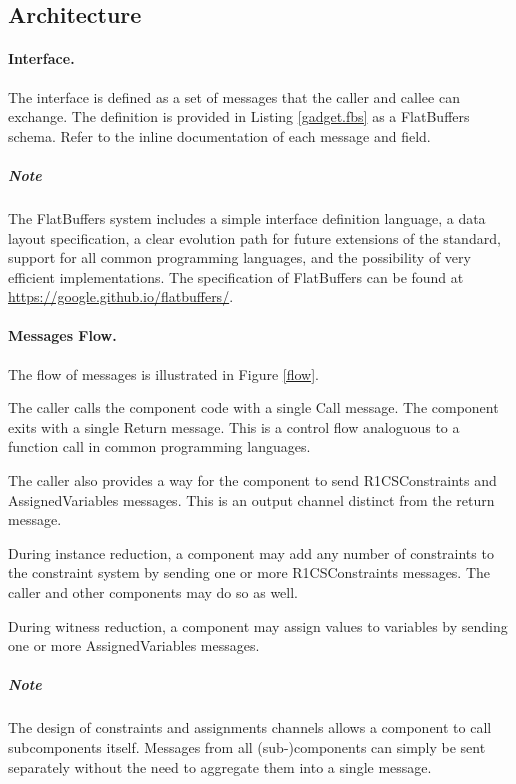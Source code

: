 \subsection{Architecture}


\paragraph{Interface.}

	The interface is defined as a set of messages that the caller and callee can exchange.
	The definition is provided in Listing \ref{gadget.fbs} as a FlatBuffers schema.
	Refer to the inline documentation of each message and field.

	\subparagraph{Note}
	The FlatBuffers system includes a simple interface definition language,
	a data layout specification,
	a clear evolution path for future extensions of the standard,
	support for all common programming languages,
	and the possibility of very efficient implementations.
	The specification of FlatBuffers can be found at
	\href{https://google.github.io/flatbuffers/}{https://google.github.io/flatbuffers/}.

\paragraph{Messages Flow.}

	The flow of messages is illustrated in Figure \ref{flow}.

	The caller calls the component code with a single Call message.
	The component exits with a single Return message.
	This is a control flow analoguous to a function call in common programming languages.

	The caller also provides a way for the component to send 
	R1CSConstraints and AssignedVariables messages.
	This is an output channel distinct from the return message.

	During instance reduction,
	a component may add any number of constraints to the constraint system
	by sending one or more R1CSConstraints messages.
	The caller and other components may do so as well.

	During witness reduction,
	a component may assign values to variables
	by sending one or more AssignedVariables messages.

	\subparagraph{Note}
	The design of constraints and assignments channels
	allows a component to call subcomponents itself.
	Messages from all (sub-)components can simply be sent separately
	without the need to aggregate them into a single message.
	

